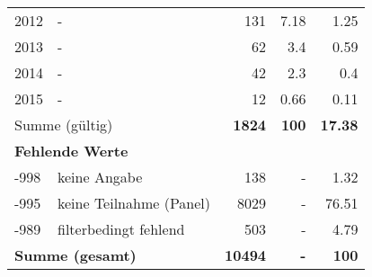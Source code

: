 \begin{longtable}{lXrrr}
     2012 &
     \multicolumn{1}{X}{ -  } &


       \num{131} &
       \num[round-mode=places,round-precision=2]{7.18} &
         \num[round-mode=places,round-precision=2]{1.25} \\

     2013 &
     \multicolumn{1}{X}{ -  } &


       \num{62} &
       \num[round-mode=places,round-precision=2]{3.4} &
         \num[round-mode=places,round-precision=2]{0.59} \\

     2014 &
     \multicolumn{1}{X}{ -  } &


       \num{42} &
       \num[round-mode=places,round-precision=2]{2.3} &
         \num[round-mode=places,round-precision=2]{0.4} \\

     2015 &
     \multicolumn{1}{X}{ -  } &


       \num{12} &
       \num[round-mode=places,round-precision=2]{0.66} &
         \num[round-mode=places,round-precision=2]{0.11} \\
     \midrule
     \multicolumn{2}{l}{Summe (gültig)} &
       \textbf{\num{1824}} &
     \textbf{\num{100}} &
       \textbf{\num[round-mode=places,round-precision=2]{17.38}} \\
     \multicolumn{5}{l}{\textbf{Fehlende Werte}}\\
       -998 &
       keine Angabe &
         \num{138} &
        - &
         \num[round-mode=places,round-precision=2]{1.32} \\
       -995 &
       keine Teilnahme (Panel) &
         \num{8029} &
        - &
         \num[round-mode=places,round-precision=2]{76.51} \\
       -989 &
       filterbedingt fehlend &
         \num{503} &
        - &
         \num[round-mode=places,round-precision=2]{4.79} \\
     \midrule
     \multicolumn{2}{l}{\textbf{Summe (gesamt)}} &
          \textbf{\num{10494}} &
        \textbf{-} &
        \textbf{\num{100}} \\
     \bottomrule
     \end{longtable}
     
